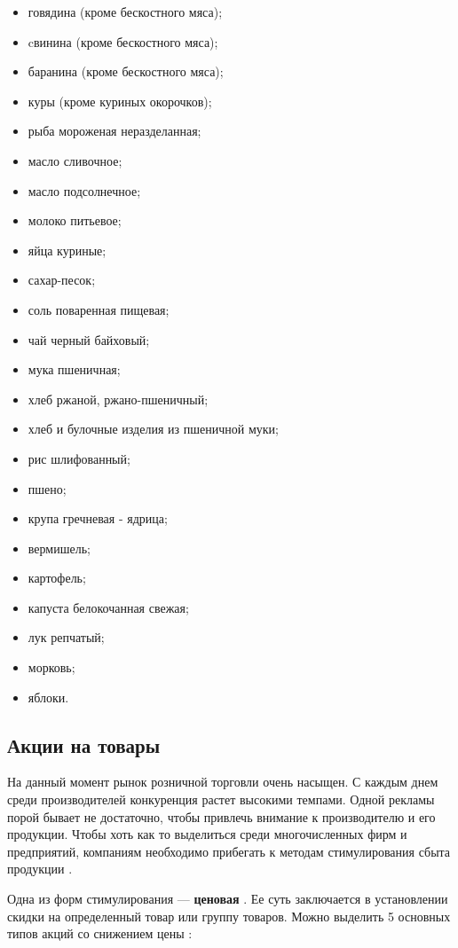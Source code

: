 \begin{itemize}[label=--]
	\item говядина (кроме бескостного мяса);
	\item cвинина (кроме бескостного мяса);
	\item баранина (кроме бескостного мяса);
	\item куры (кроме куриных окорочков);
	\item рыба мороженая неразделанная;
	\item масло сливочное;
	\item масло подсолнечное;
	\item молоко питьевое;
	\item яйца куриные;
	\item сахар-песок;
	\item соль поваренная пищевая;
	\item чай черный байховый;
	\item мука пшеничная;
	\item хлеб ржаной, ржано-пшеничный;
	\item хлеб и булочные изделия из пшеничной муки;
	\item рис шлифованный;
	\item пшено;
	\item крупа гречневая - ядрица;
	\item вермишель;
	\item картофель;
	\item капуста белокочанная свежая;
	\item лук репчатый;
	\item морковь;
	\item яблоки.
\end{itemize}

\clearpage

\subsection{Акции на товары}

На данный момент рынок розничной торговли очень насыщен. 
С каждым днем среди производителей конкуренция растет высокими темпами. 
Одной рекламы порой бывает не достаточно, чтобы привлечь внимание к производителю и его продукции. 
Чтобы хоть как то выделиться среди многочисленных фирм и предприятий, компаниям необходимо прибегать к методам стимулирования сбыта продукции \cite{info_stock}.

Одна из форм стимулирования --- \textbf{ценовая} \cite{info_stock}. 
Ее суть заключается в установлении скидки на определенный товар или группу товаров.
Можно выделить 5 основных типов акций со снижением  цены \cite{info_promotion1, info_promotion2}:

